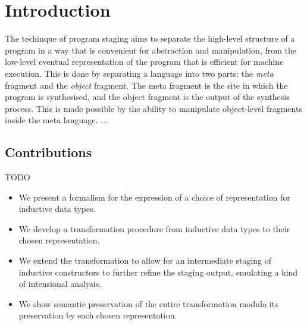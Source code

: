 \section{Introduction}\label{sec:intro}

The techinque of program staging aims to separate the high-level structure of a
program in a way that is convenient for abstraction and manipulation, from the
low-level eventual representation of the program that is efficient for machine
execution. This is done by separating a language into two parts: the
\emph{meta} fragment and the \emph{object} fragment. The meta fragment is the
site in which the program is synthesised, and the object fragment is the output
of the synthesis process. This is made possible by the ability to manipulate
object-level fragments inside the meta language. ...

\subsection{Contributions}

TODO

\begin{itemize}
  \item We present a formalism for the expression of a choice of representation for
        inductive data types.
  \item We develop a transformation procedure from inductive data types to their chosen
        representation.
  \item We extend the transformation to allow for an intermediate staging of inductive
        constructors to further refine the staging output, emulating a kind of
        intensional analysis.
  \item We show semantic preservation of the entire transformation modulo its
        preservation by each chosen representation.
\end{itemize}


